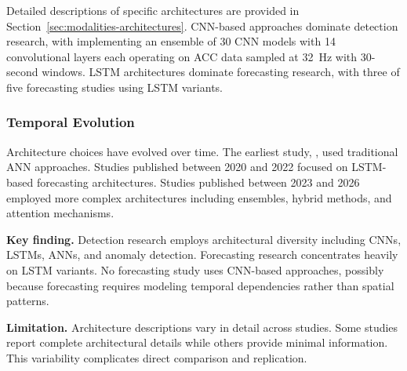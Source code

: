 Detailed descriptions of specific architectures are provided in Section~\ref{sec:modalities-architectures}. CNN-based approaches dominate detection research, with \textcite{spahrDeepLearningbasedDetection2025} implementing an ensemble of 30 CNN models with 14 convolutional layers each operating on ACC data sampled at 32~Hz with 30-second windows. LSTM architectures dominate forecasting research, with three of five forecasting studies using LSTM variants.

\subsubsection{Temporal Evolution}

Architecture choices have evolved over time. The earliest study, \textcite{borujenyDetectionEpilepticSeizure2013}, used traditional ANN approaches. Studies published between 2020 and 2022 focused on LSTM-based forecasting architectures. Studies published between 2023 and 2026 employed more complex architectures including ensembles, hybrid methods, and attention mechanisms.

\textbf{Key finding.} Detection research employs architectural diversity including CNNs, LSTMs, ANNs, and anomaly detection. Forecasting research concentrates heavily on LSTM variants. No forecasting study uses CNN-based approaches, possibly because forecasting requires modeling temporal dependencies rather than spatial patterns.

\textbf{Limitation.} Architecture descriptions vary in detail across studies. Some studies report complete architectural details while others provide minimal information. This variability complicates direct comparison and replication.
